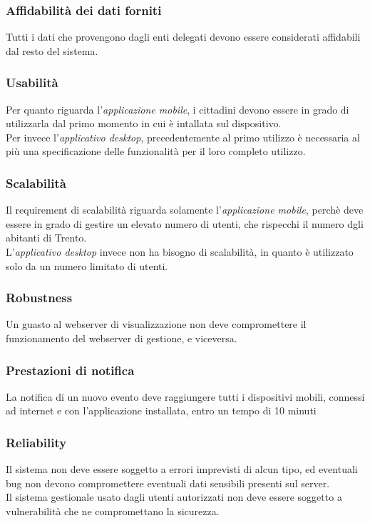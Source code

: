 \documentclass{article}
\begin{document}
\subsubsection{Affidabilità dei dati forniti}
Tutti i dati che provengono dagli enti delegati devono essere considerati affidabili dal resto del sistema.

\subsubsection{Usabilità}
Per quanto riguarda l'\textit{applicazione mobile}, i cittadini devono essere in grado di utilizzarla dal primo momento in cui è intallata sul dispositivo.\\
Per invece l'\textit{applicativo desktop}, precedentemente al primo utilizzo è necessaria al più una specificazione delle funzionalità per il loro completo utilizzo.

\subsubsection{Scalabilità}
Il requirement di scalabilità riguarda solamente l'\textit{applicazione mobile}, perchè deve essere in grado di gestire un elevato numero di utenti, che rispecchi il numero dgli abitanti di Trento.\\
L'\textit{applicativo desktop} invece non ha bisogno di scalabilità, in quanto è utilizzato solo da un numero limitato di utenti.

\subsubsection{Robustness}
Un guasto al webserver di visualizzazione non deve compromettere il funzionamento del webserver di gestione, e viceversa.

\subsubsection{Prestazioni di notifica}
La notifica di un nuovo evento deve raggiungere tutti i dispositivi mobili, connessi ad internet e con l'applicazione installata, entro un tempo di 10 minuti

\subsubsection{Reliability}
Il sistema non deve essere soggetto a errori imprevisti di alcun tipo, ed eventuali bug non devono compromettere eventuali dati sensibili presenti sul server.\\
Il sistema gestionale usato dagli utenti autorizzati non deve essere soggetto a vulnerabilità che ne compromettano la sicurezza. 
\end{document}
